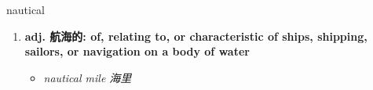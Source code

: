 
\begin{frame}
{\huge nautical}
\begin{center}
\begin{enumerate}\Large
  \item \textbf{adj. 航海的: of, relating to, or characteristic of ships, shipping, sailors, or navigation on a body of water}
  \begin{itemize}
    \item \em{\Large{nautical mile 海里}}
  \end{itemize}
\end{enumerate}
\end{center}
\end{frame}
